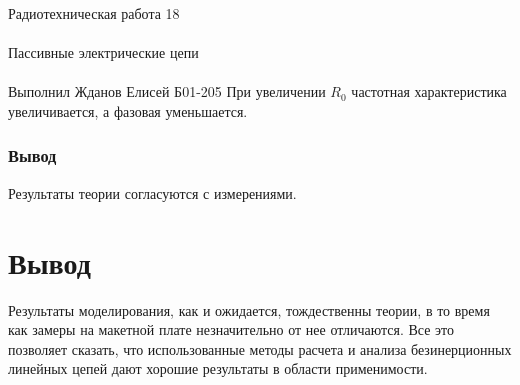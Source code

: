 \documentclass{astroedu-lab}
\begin{document}
\begin{problem}{\huge Радиотехническая работа 18\\\\Пассивные электрические цепи\\\\Выполнил Жданов Елисей Б01-205}
При увеличении $R_0$ частотная характеристика увеличивается, а фазовая уменьшается.

\subsubsection{Вывод}

Результаты теории согласуются с измерениями.

\section{Вывод}

Результаты моделирования, как и ожидается, тождественны теории, в то время как замеры на макетной плате незначительно от нее отличаются. Все это позволяет сказать, что использованные методы расчета и анализа безинерционных линейных цепей дают хорошие результаты в области применимости.


\end{problem}
\end{document}

